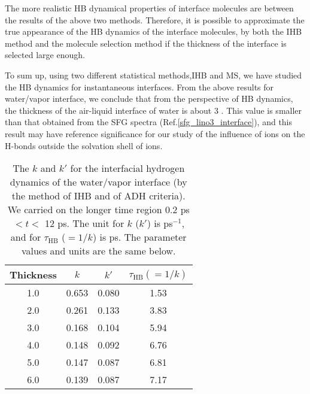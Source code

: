 {The more realistic HB dynamical properties of interface molecules are between the results of the above two methods. 
Therefore, it is possible to approximate the true appearance of the HB dynamics of the interface molecules, 
by both the IHB method and the molecule selection method if the thickness of the interface is selected large enough. 

To sum up, using two different statistical methods,IHB and MS, 
we have studied the HB dynamics for instantaneous interfaces. From the above results for water/vapor interface, we conclude that from the perspective of HB dynamics,
the thickness of the air-liquid interface of water is about 3 \A. This value is smaller than that obtained from the SFG spectra 
(Ref.\thinspace\ref{sfg_lino3_interface}), and this result may have reference significance for our study of the influence of ions on the H-bonds 
outside the solvation shell of ions. 
%
\begin{table}[htb]
\centering
\caption{\label{tab:k_k_prime_tau_128w_pure_ihb_ADH} 
    The $k$ and $k'$ for the interfacial hydrogen dynamics of the water/vapor interface (by the method of IHB and of ADH criteria). 
We carried on the longer time region 0.2 ps $< t <$ 12 ps. The unit for $k$ ($k'$) is ps$^{-1}$, and for $\tau_{\text{HB}}$ ($=1/k$) 
is ps. The parameter values and units are the same below.} 
\begin{tabular}{cccc}
 Thickness & $k$ & $k'$ & $\tau_{\text{HB}} (=1/k)$ \\
\hline
  1.0 & 0.653 & 0.080 & 1.53  \\
  2.0 & 0.261 & 0.133 & 3.83  \\
  3.0 & 0.168 & 0.104 & 5.94  \\
  4.0 & 0.148 & 0.092 & 6.76  \\
  5.0 & 0.147 & 0.087 & 6.81  \\
  6.0 & 0.139 & 0.087 & 7.17  \\
\end{tabular}
\end{table}
\begin{table}[htb]

\end{table}}
